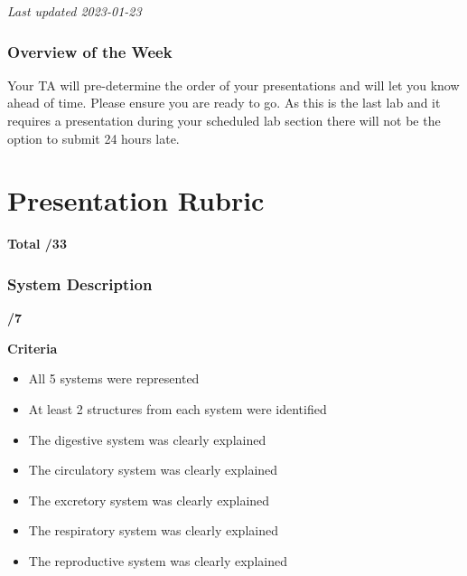 \documentclass[
]{book}
\providecommand{\tightlist}{%
  \setlength{\itemsep}{0pt}\setlength{\parskip}{0pt}}
\begin{document}
\emph{Last updated 2023-01-23}

\hypertarget{overview-of-the-week-4}{%
\subsection*{Overview of the Week}\label{overview-of-the-week-4}}

Your TA will pre-determine the order of your presentations and will let you know ahead of time. Please ensure you are ready to go. As this is the last lab and it requires a presentation during your scheduled lab section there will not be the option to submit 24 hours late.

\hypertarget{presentation-rubric}{%
\chapter*{Presentation Rubric}\label{presentation-rubric}}

\textbf{Total /33}

\hypertarget{system-description}{%
\subsection*{System Description}\label{system-description}}

\textbf{/7}

\textbf{Criteria}

\begin{itemize}
\tightlist
\item
  All 5 systems were represented
\item
  At least 2 structures from each system were identified
\item
  The digestive system was clearly explained
\item
  The circulatory system was clearly explained
\item
  The excretory system was clearly explained
\item
  The respiratory system was clearly explained
\item
  The reproductive system was clearly explained
\end{itemize}
\end{document}
